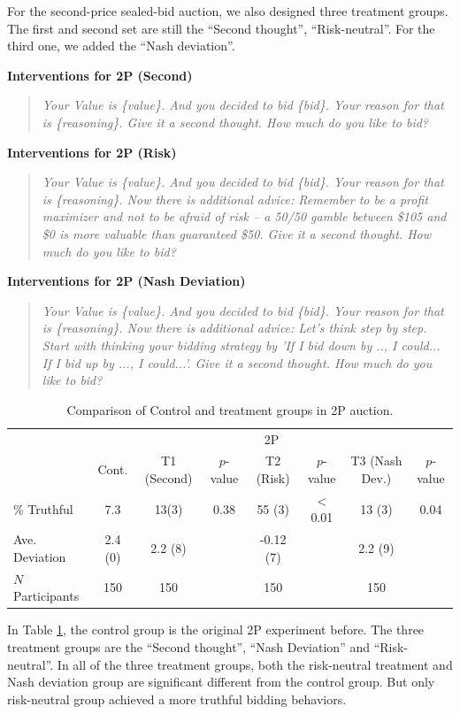 \documentclass{article} %
\begin{document}
For the second-price sealed-bid auction, we also designed three treatment groups. The first and second set are still the ``Second thought'', ``Risk-neutral''. For the third one, we added the ``Nash deviation''. 

\textbf{Interventions for 2P (Second)}
\begin{quote}
\textit{Your Value is \{value\}. And you decided to bid \{bid\}. Your reason for that is \{reasoning\}.
 Give it a second thought. How much do you like to bid?
}
\end{quote}

\textbf{Interventions for 2P (Risk)}
\begin{quote}
\textit{Your Value is \{value\}. And you decided to bid \{bid\}. Your reason for that is \{reasoning\}.
Now there is additional advice: Remember to be a profit maximizer and not to be afraid of risk -- a 50/50 gamble between \$105 and \$0 is more valuable than guaranteed \$50. 
Give it a second thought.
How much do you like to bid?
}
\end{quote}

\textbf{Interventions for 2P (Nash Deviation)}
\begin{quote}
\textit{Your Value is \{value\}. And you decided to bid \{bid\}. Your reason for that is \{reasoning\}.
Now there is additional advice: Let's think step by step. Start with thinking your bidding strategy by 'If I bid down by .., I could... If I bid up by ..., I could...'. 
Give it a second thought.
How much do you like to bid?
}
\end{quote}


\begin{table}[htbp]
\centering
\begin{tabular}{lccccccc}
\hline
& \multicolumn{7}{c}{2P} \\
\cline{2-8}
& Cont. & T1 (Second) & $p$-value & T2 (Risk) & $p$-value & T3 (Nash Dev.) & $p$-value \\
\hline
\% Truthful & 7.3 & 13(3) & 0.38 & 55 (3) & $<$0.01 & 13 (3) & 0.04 \\
Ave. Deviation & 2.4 (0) & 2.2 (8) &  & -0.12 (7) &  & 2.2 (9) & \\
$N$ Participants & 150 & 150 & & 150 & & 150 & \\
\hline
\end{tabular}
\caption{Comparison of Control and treatment groups in 2P auction.}
\label{tab:comparison_2p}
\end{table}

 In Table \ref{tab:comparison_2p}, the control group is the original 2P experiment before. The three treatment groups are the ``Second thought'', ``Nash Deviation'' and ``Risk-neutral''. In all of the three treatment groups, both the risk-neutral treatment and Nash deviation group are significant different from the control group. But only risk-neutral group achieved a more truthful bidding behaviors.
\end{document}
